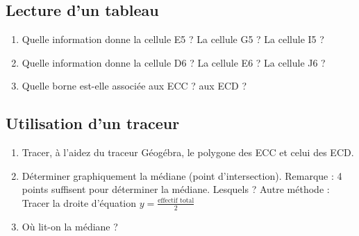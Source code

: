 \subsection*{Lecture d'un tableau}

\begin{enumerate}
\item Quelle information donne la cellule E5 ? La cellule G5 ? La cellule I5 ?
\item Quelle information donne la cellule D6 ? La cellule E6 ? La cellule J6 ?
\item Quelle borne est-elle associée aux ECC ? aux ECD ?
\end{enumerate}


\subsection*{Utilisation d'un traceur}


\begin{enumerate}
\item  Tracer, à l'aidez du traceur Géogébra, le polygone des ECC et celui des ECD.
\item  Déterminer graphiquement la médiane (point d’intersection).
Remarque : 4 points suffisent pour déterminer la médiane. Lesquels ?
Autre méthode : Tracer la droite d'équation $y =\frac{\text{effectif total}}{2}$
\item  Où lit-on la médiane ?
\end{enumerate}